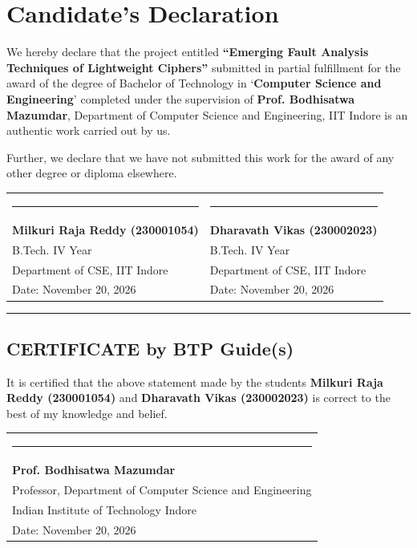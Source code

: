 \documentclass[12pt,a4paper,oneside]{report}
\begin{document}
\chapter*{Candidate's Declaration}

We hereby declare that the project entitled \textbf{``Emerging Fault Analysis Techniques of Lightweight Ciphers''} submitted in partial fulfillment for the award of the degree of Bachelor of Technology in `\textbf{Computer Science and Engineering}' completed under the supervision of \textbf{Prof. Bodhisatwa Mazumdar}, Department of Computer Science and Engineering, IIT Indore is an authentic work carried out by us.

\noindent
Further, we declare that we have not submitted this work for the award of any other degree or diploma elsewhere.

\vspace{2.5cm}
\noindent
\begin{tabular*}{\textwidth}{@{\extracolsep{\fill}}ll}
\rule{6.5cm}{0.4pt} & \rule{6.5cm}{0.4pt} \\
\textbf{Milkuri Raja Reddy (230001054)} & \textbf{Dharavath Vikas (230002023)} \\
B.Tech. IV Year & B.Tech. IV Year \\
Department of CSE, IIT Indore & Department of CSE, IIT Indore \\
Date: November 20, 2026 & Date: November 20, 2026 \\
\end{tabular*}

\vspace{1.5cm}
\noindent
\rule{\textwidth}{1.0pt}
\vspace{0.5cm}

\section*{CERTIFICATE by BTP Guide(s)}

It is certified that the above statement made by the students \textbf{Milkuri Raja Reddy (230001054)} and \textbf{Dharavath Vikas (230002023)} is correct to the best of my knowledge and belief.

\vspace{2.5cm}
\noindent
\begin{tabular}{l}
\rule{7.0cm}{0.4pt} \\
\textbf{Prof. Bodhisatwa Mazumdar} \\
Professor, Department of Computer Science and Engineering \\
Indian Institute of Technology Indore \\
Date: November 20, 2026 \\
\end{tabular}
\end{document}
